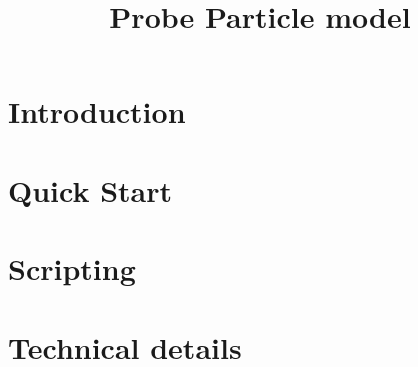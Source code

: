 \documentclass[english]{book}
\title{Probe Particle model}
\author{}
\begin{document}
\maketitle

\tableofcontents

\chapter{Introduction}
  

\chapter{Quick Start}


\chapter{Scripting}


\chapter{Technical details}




\newpage



\end{document}
